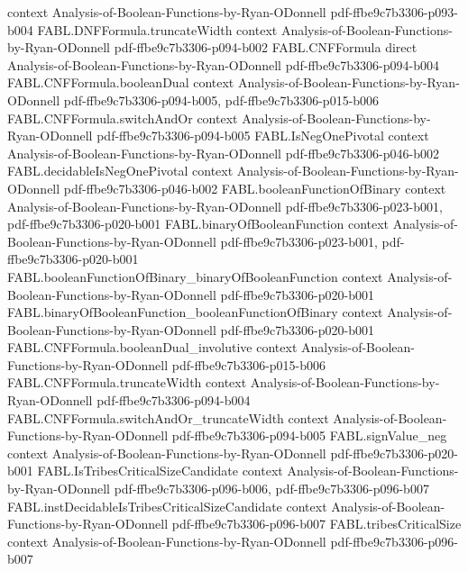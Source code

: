 \begin{theorem}
  {context}
  {Analysis-of-Boolean-Functions-by-Ryan-ODonnell}
  {pdf-ffbe9c7b3306-p093-b004}
\proofstep
  {FABL.DNFFormula.truncateWidth}
  {context}
  {Analysis-of-Boolean-Functions-by-Ryan-ODonnell}
  {pdf-ffbe9c7b3306-p094-b002}
\proofstep
  {FABL.CNFFormula}
  {direct}
  {Analysis-of-Boolean-Functions-by-Ryan-ODonnell}
  {pdf-ffbe9c7b3306-p094-b004}
\proofstep
  {FABL.CNFFormula.booleanDual}
  {context}
  {Analysis-of-Boolean-Functions-by-Ryan-ODonnell}
  {pdf-ffbe9c7b3306-p094-b005,
    pdf-ffbe9c7b3306-p015-b006}
\proofstep
  {FABL.CNFFormula.switchAndOr}
  {context}
  {Analysis-of-Boolean-Functions-by-Ryan-ODonnell}
  {pdf-ffbe9c7b3306-p094-b005}
\proofstep
  {FABL.IsNegOnePivotal}
  {context}
  {Analysis-of-Boolean-Functions-by-Ryan-ODonnell}
  {pdf-ffbe9c7b3306-p046-b002}
\proofstep
  {FABL.decidableIsNegOnePivotal}
  {context}
  {Analysis-of-Boolean-Functions-by-Ryan-ODonnell}
  {pdf-ffbe9c7b3306-p046-b002}
\proofstep
  {FABL.booleanFunctionOfBinary}
  {context}
  {Analysis-of-Boolean-Functions-by-Ryan-ODonnell}
  {pdf-ffbe9c7b3306-p023-b001,
    pdf-ffbe9c7b3306-p020-b001}
\proofstep
  {FABL.binaryOfBooleanFunction}
  {context}
  {Analysis-of-Boolean-Functions-by-Ryan-ODonnell}
  {pdf-ffbe9c7b3306-p023-b001,
    pdf-ffbe9c7b3306-p020-b001}
\proofstep
  {FABL.booleanFunctionOfBinary_binaryOfBooleanFunction}
  {context}
  {Analysis-of-Boolean-Functions-by-Ryan-ODonnell}
  {pdf-ffbe9c7b3306-p020-b001}
\proofstep
  {FABL.binaryOfBooleanFunction_booleanFunctionOfBinary}
  {context}
  {Analysis-of-Boolean-Functions-by-Ryan-ODonnell}
  {pdf-ffbe9c7b3306-p020-b001}
\proofstep
  {FABL.CNFFormula.booleanDual_involutive}
  {context}
  {Analysis-of-Boolean-Functions-by-Ryan-ODonnell}
  {pdf-ffbe9c7b3306-p015-b006}
\proofstep
  {FABL.CNFFormula.truncateWidth}
  {context}
  {Analysis-of-Boolean-Functions-by-Ryan-ODonnell}
  {pdf-ffbe9c7b3306-p094-b004}
\proofstep
  {FABL.CNFFormula.switchAndOr_truncateWidth}
  {context}
  {Analysis-of-Boolean-Functions-by-Ryan-ODonnell}
  {pdf-ffbe9c7b3306-p094-b005}
\proofstep
  {FABL.signValue_neg}
  {context}
  {Analysis-of-Boolean-Functions-by-Ryan-ODonnell}
  {pdf-ffbe9c7b3306-p020-b001}
\proofstep
  {FABL.IsTribesCriticalSizeCandidate}
  {context}
  {Analysis-of-Boolean-Functions-by-Ryan-ODonnell}
  {pdf-ffbe9c7b3306-p096-b006,
    pdf-ffbe9c7b3306-p096-b007}
\proofstep
  {FABL.instDecidableIsTribesCriticalSizeCandidate}
  {context}
  {Analysis-of-Boolean-Functions-by-Ryan-ODonnell}
  {pdf-ffbe9c7b3306-p096-b007}
\proofstep
  {FABL.tribesCriticalSize}
  {context}
  {Analysis-of-Boolean-Functions-by-Ryan-ODonnell}
  {pdf-ffbe9c7b3306-p096-b007}

\end{theorem}
